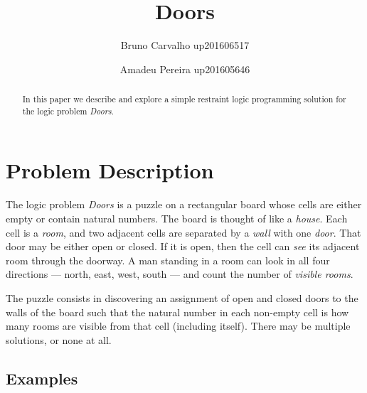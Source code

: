 \documentclass[runningheads]{llncs}
\begin{document}
%
\title{Doors}
%
%
\author{Bruno Carvalho up201606517 \and Amadeu Pereira up201605646}
%
%

\maketitle

\begin{abstract}
In this paper we describe and explore a simple restraint logic programming solution for the logic problem \textit{Doors}.

\end{abstract}

\section{Problem Description}
\label{sec:description}

The logic problem \textit{Doors} is a puzzle on a rectangular board whose cells are either empty or contain natural numbers. The board is thought of like a \textit{house}. Each cell is a \textit{room}, and two adjacent cells are separated by a \textit{wall} with one \textit{door}. That door may be either open or closed. If it is open, then the cell can \textsl{see} its adjacent room through the doorway. A man standing in a room can look in all four directions --- north, east, west, south --- and count the number of \textit{visible rooms}.

The puzzle consists in discovering an assignment of open and closed doors to the walls of the board such that the natural number in each non-empty cell is how many rooms are visible from that cell (including itself). There may be multiple solutions, or none at all.

\subsection{Examples}
\end{document}
